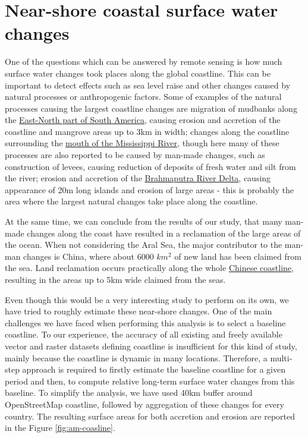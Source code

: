 \section{Near-shore coastal surface water changes}
One of the questions which can be answered by remote sensing is how much surface water changes took places along the global coastline. This can be important to detect effects such as sea level raise and other changes caused by natural processes or anthropogenic factors. Some of examples of the natural processes causing the largest coastline changes are migration of mudbanks along the \href{http://aqua-monitor.appspot.com/?from=2000&to=2016&view=5.37464731850053,-52.96134948730469,11z}{East-North part of South America}, causing erosion and accretion of the coastline and mangrove areas up to 3km in width; changes along the coastline surrounding the \href{http://aqua-monitor.appspot.com/?mode=dynamic&from=2000&to=2016&view=29.161696898682372,-89.24575805664062,11z}{mouth of the Mississippi River}, though here many of these processes are also reported to be caused by man-made changes, such as construction of levees, causing reduction of deposits of fresh water and silt from the river; erosion and accretion of the \href{http://aqua-monitor.appspot.com/?from=2000&to=2016&view=22.47760292118218,90.76316833496092,9z}{Brahmaputra River Delta}, causing appearance of 20m long islands and erosion of large areas - this is probably the area where the largest natural changes take place along the coastline. 

At the same time, we can conclude from the results of our study, that many man-made changes along the coast have resulted in a reclamation of the large areas of the ocean. When not considering the Aral Sea, the major contributor to the man-man changes is China, where about 6000 $km^2$ of new land has been claimed from the sea. Land reclamation occurs practically along the whole \href{http://aqua-monitor.appspot.com/?from=2000&to=2016&view=27.965842094147863,120.95462799072264,11z}{Chinese coastline}, resulting in the areas up to 5km wide claimed from the seas.

Even though this would be a very interesting study to perform on its own, we have tried to roughly estimate these near-shore changes. One of the main challenges we have faced when performing this analysis is to select a baseline coastline. To our experience, the accuracy of all existing and freely available vector and raster datasets defining coastline is insufficient for this kind of study, mainly because the coastline is dynamic in many locations. Therefore, a multi-step approach is required to firstly estimate the baseline coastline for a given period and then, to compute relative long-term surface water changes from this baseline. To simplify the analysis, we have used 40km buffer around OpenStreetMap coastline, followed by aggregation of these changes for every country. The resulting surface areas for both accretion and erosion are reported in the Figure \ref{fig:am-coasline}.

